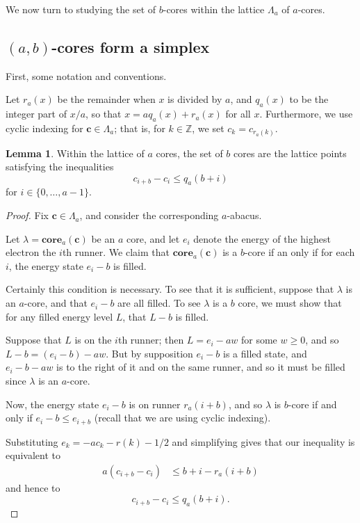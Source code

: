 \documentclass{amsart}[12pt]
\theoremstyle{definition}
\newtheorem{lemma}[dummy]{Lemma}
\newcommand{\Z}{\mathbb{Z}}
\newcommand{\core}{\mathbf{core}}
\begin{document}
We now turn to studying the set of $b$-cores within the lattice
$\Lambda_a$ of $a$-cores.
\subsection{\texorpdfstring{$(a,b)$}{(a,b)}-cores form a simplex}

First, some notation and conventions.

Let $r_a(x)$ be the remainder when $x$ is divided by $a$, and $q_a(x)$ to be the integer part of $x/a$, so that $x=aq_a(x)+r_a(x)$ for all $x$.
Furthermore, we use cyclic indexing for $\mathbf{c}\in\Lambda_a$;
that is, for $k\in\Z$, we set $c_k=c_{r_a(k)}$.

\begin{lemma}
Within the lattice of $a$ cores, the set of $b$ cores are the
lattice points satisfying the inequalities $$c_{i+b}-c_{i}\leq q_a(b+i)$$
for $i\in\{0,\dots,a-1\}$.
\end{lemma}

\begin{proof}

Fix $\mathbf{c}\in\Lambda_a$, and consider the corresponding
$a$-abacus.

Let $\lambda=\core_a(\mathbf{c})$ be an $a$ core, and let $e_i$ denote the energy of the highest electron the $i$th runner.  We claim that $\core_a(\mathbf{c})$ is a $b$-core if an only if for each $i$, the energy state $e_i-b$ is filled.

Certainly this condition is necessary.  To see that it is sufficient, suppose that $\lambda$ is an $a$-core, and that $e_i-b$ are all filled.  To see $\lambda$ is a $b$ core, we must show that for any filled energy level $L$, that $L-b$ is filled.  

Suppose that $L$ is on the $i$th runner; then $L=e_i-aw$ for some $w\geq 0$, and so $L-b=(e_i-b)-aw$.  But by supposition $e_i-b$ is a filled state, and $e_i-b-aw$ is to the right of it and on the same runner, and so it must be filled since $\lambda$ is an $a$-core.

Now, the energy state $e_{i}-b$ is on runner $r_a(i+b)$, and so
$\lambda$ is $b$-core if and only if $e_{i}-b\leq e_{i+b}$ (recall that we are using cyclic indexing).

Substituting $e_k=-ac_k-r(k)-1/2$ and simplifying gives that our inequality is equivalent to
\begin{align*}
a(c_{i+b}-c_i)& \leq b+i-r_a(i+b)
\end{align*}
and hence to
$$c_{i+b}-c_i \leq q_a(b+i).$$

\end{proof}
\end{document}
